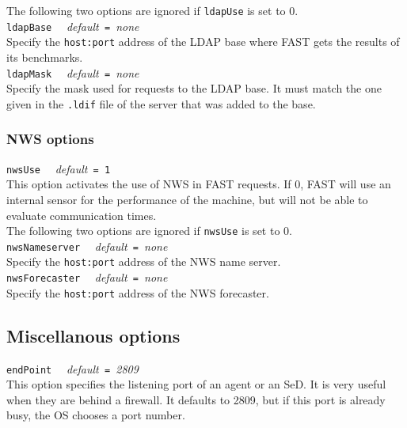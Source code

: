 The following two options are ignored if \texttt{ldapUse} is set to 0.
\\

\noindent
\texttt{ldapBase} \ \ \emph{default}\texttt{ = }\emph{none}\\
Specify the \texttt{host:port} address of the LDAP base where FAST gets the
results of its benchmarks.
\\

\noindent
\texttt{ldapMask} \ \ \emph{default}\texttt{ = }\emph{none}\\
Specify the mask used for requests to the LDAP base. It must match the one given
in the \texttt{.ldif} file of the server that was added to the base.


\subsubsection{NWS options}

\noindent
\texttt{nwsUse} \ \ \emph{default}\texttt{ = 1}\\
This option activates the use of NWS in FAST requests. If 0, FAST will use an
internal sensor for the performance of the machine, but will not be able to
evaluate communication times.
\\

The following two options are ignored if \texttt{nwsUse} is set to 0.
\\

\noindent
\texttt{nwsNameserver} \ \ \emph{default}\texttt{ = }\emph{none}\\
Specify the \texttt{host:port} address of the NWS name server.
\\

\noindent
\texttt{nwsForecaster} \ \ \emph{default}\texttt{ = }\emph{none}\\
Specify the \texttt{host:port} address of the NWS forecaster.
\\


\subsection{Miscellanous options}

\texttt{endPoint} \ \ \emph{default}\texttt{ = }\emph{2809}\\
This option specifies the listening port of an agent or an SeD. It is very
useful when they are behind a firewall. It defaults to 2809, but if this port is
already busy, the OS chooses a port number.

